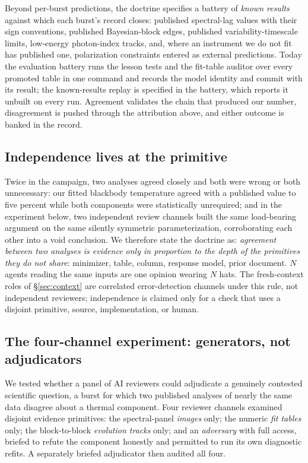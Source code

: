 Beyond per-burst predictions, the doctrine specifies a battery of
\emph{known results} against which each burst's record closes: published
spectral-lag values with their sign conventions, published Bayesian-block
edges, published variability-timescale limits, low-energy photon-index
tracks, and, where an instrument we do not fit has published one,
polarization constraints entered as external predictions. Today the
evaluation battery runs the lesson tests and the fit-table auditor over
every promoted table in one command and records the model identity and
commit with its result; the known-results replay is specified in the
battery, which reports it unbuilt on every run. Agreement validates the chain that produced our number,
disagreement is pushed through the attribution above, and either outcome
is banked in the record.

\subsection{Independence lives at the primitive}

Twice in the campaign, two analyses agreed closely and both were wrong or
both unnecessary: our fitted blackbody temperature agreed with a published
value to five percent while both components were statistically unrequired;
and in the experiment below, two independent review channels built the
same load-bearing argument on the same silently symmetric
parameterization, corroborating each other into a void conclusion. We
therefore state the doctrine as: \emph{agreement between two analyses is
evidence only in proportion to the depth of the primitives they do not
share}: minimizer, table, column, response model, prior document. $N$
agents reading the same inputs are one opinion wearing $N$ hats. The
fresh-context roles of \S\ref{sec:context} are correlated error-detection
channels under this rule, not independent reviewers; independence is
claimed only for a check that uses a disjoint primitive, source,
implementation, or human.

\subsection{The four-channel experiment: generators, not adjudicators}

We tested whether a panel of AI reviewers could adjudicate a genuinely
contested scientific question, a burst for which two published analyses of
nearly the same data disagree about a thermal component. Four reviewer
channels examined disjoint evidence primitives: the spectral-panel
\emph{images} only; the numeric \emph{fit tables} only; the block-to-block
\emph{evolution tracks} only; and an \emph{adversary} with full access,
briefed to refute the component honestly and permitted to run its own
diagnostic refits. A separately briefed adjudicator then audited all four.


